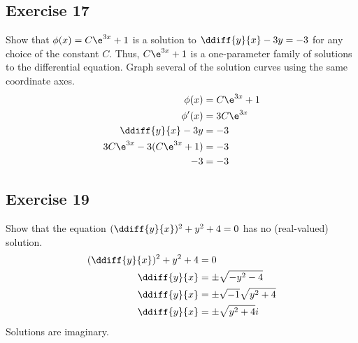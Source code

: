 \documentclass{math}
\begin{document}
\subsection*{Exercise 17}
Show that \( \phi(x) = C\e^{3x}+1 \) is a solution to \( \ddiff{y}{x}-3y = -3 \)
for any choice of the constant \( C \). Thus, \( C\e^{3x}+1 \) is a
one-parameter family of solutions to the differential equation. Graph several of
the solution curves using the same coordinate axes.
\begin{align*}
  \phi(x) &= C\e^{3x}+1 \\
  \phi'(x) &= 3C\e^{3x} \\
  \ddiff{y}{x}-3y &= -3 \\
  3C\e^{3x}-3(C\e^{3x}+1) &= -3 \\
  -3 &= -3
\end{align*}
\begin{center}
\end{center}

\subsection*{Exercise 19}
Show that the equation \( (\ddiff{y}{x})^2+y^2+4 = 0 \) has no (real-valued)
solution.
\begin{align*}
  (\ddiff{y}{x})^2+y^2+4 &= 0 \\
  \ddiff{y}{x} &= \pm\sqrt{-y^2-4} \\
  \ddiff{y}{x} &= \pm\sqrt{-1}\sqrt{y^2+4} \\
  \ddiff{y}{x} &= \pm\sqrt{y^2+4}i
\end{align*}
Solutions are imaginary.
\end{document}
